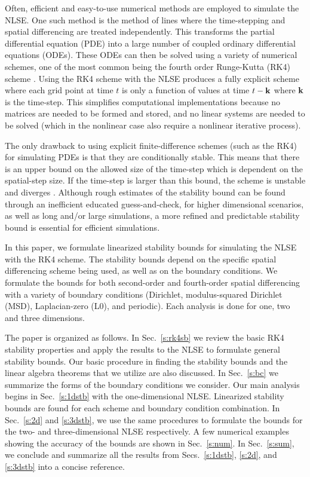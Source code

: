 \documentclass{article}
\begin{document}
Often, efficient and easy-to-use numerical methods are employed to simulate the NLSE. One such method is the method of lines where the time-stepping and spatial differencing are treated independently. This transforms the partial differential equation (PDE) into a large number of coupled ordinary differential equations (ODEs). These ODEs can then be solved using a variety of numerical schemes, one of the most common being the fourth order Runge-Kutta (RK4) scheme \cite{RK4}. Using the RK4 scheme with the NLSE produces a fully explicit scheme where each grid point at time $t$ is only a function of values at time $t-{\bf k}$ where ${\bf k}$ is the time-step. This simplifies computational implementations because no matrices are needed to be formed and stored, and no linear systems are needed to be solved (which in the nonlinear case also require a nonlinear iterative process). 

The only drawback to using explicit finite-difference schemes (such as the RK4) for simulating PDEs is that they are conditionally stable.  This means that there is an upper bound on the allowed size of the time-step which is dependent on the spatial-step size. If the time-step is larger than this bound, the scheme is unstable and diverges \cite{FD_PDE_BOOK}. Although rough estimates of the stability bound can be found through an inefficient educated guess-and-check, for higher dimensional scenarios, as well as long and/or large simulations, a more refined and predictable stability bound is essential for efficient simulations.   

In this paper, we formulate linearized stability bounds for simulating the NLSE with the RK4 scheme. The stability bounds depend on the specific spatial differencing scheme being used, as well as on the boundary conditions. We formulate the bounds for both second-order and fourth-order spatial differencing with a variety of boundary conditions (Dirichlet, modulus-squared Dirichlet (MSD), Laplacian-zero (L0), and periodic). Each analysis is done for one, two and three dimensions.

The paper is organized as follows. In Sec.~\ref{s:rk4sb} we review the basic RK4 stability properties and apply the results to the NLSE to formulate general stability bounds. Our basic procedure in finding the stability bounds and the linear algebra theorems that we utilize are also discussed. In Sec.~\ref{s:bc} we summarize the forms of the boundary conditions we consider. Our main analysis begins in Sec.~\ref{s:1dstb} with the one-dimensional NLSE. Linearized stability bounds are found for each scheme and boundary condition combination. In Sec.~\ref{s:2d} and \ref{s:3dstb}, we use the same procedures to formulate the bounds for the two- and three-dimensional NLSE respectively.  A few numerical examples showing the accuracy of the bounds are shown in Sec.~\ref{s:num}.  In Sec.~\ref{s:sum}, we conclude and summarize all the results from Secs.~\ref{s:1dstb}, \ref{s:2d}, and \ref{s:3dstb} into a concise reference.
\end{document}
